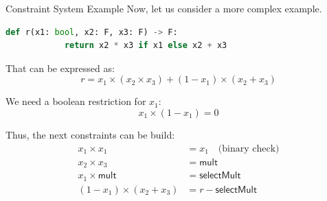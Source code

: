 \documentclass{beamer}
\begin{document}
    \begin{frame}[fragile]{Constraint System Example}
        Now, let us consider a more complex example.
        \begin{lstlisting}[language=Python,numbers=none]
        def r(x1: bool, x2: F, x3: F) -> F:
            return x2 * x3 if x1 else x2 + x3
        \end{lstlisting}
        That can be expressed as:
        \begin{equation*}
            r = x_1 \times (x_2 \times x_3) + (1 - x_1) \times (x_2 + x_3)
        \end{equation*}
        
        \pause
        \begin{alertblock}{}
            We need a boolean restriction for $x_1$:
            \vspace{-8pt}
            \begin{equation*}
                x_1 \times (1 - x_1) = 0
            \end{equation*}
        \end{alertblock}

        \pause
        Thus, the next constraints can be build:
        \vspace{-5pt}
        \begin{align*}
            x_1 \times x_1 &= x_1 \quad \text{(binary check)} \tag{1} \\
            x_2 \times x_3 &= \mathsf{mult} \tag{2} \\
            x_1 \times \mathsf{mult} &= \mathsf{selectMult} \tag{3} \\
            (1 - x_1) \times (x_2 + x_3) &= r - \mathsf{selectMult} \tag{4}
        \end{align*}
    \end{frame}
\end{document}
